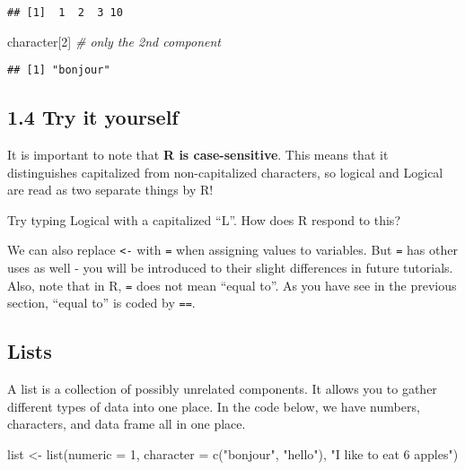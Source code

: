 \documentclass[
]{book}
\newenvironment{Shaded}{\begin{snugshade}}{\end{snugshade}}
\newcommand{\AttributeTok}[1]{\textcolor[rgb]{0.77,0.63,0.00}{#1}}
\newcommand{\CommentTok}[1]{\textcolor[rgb]{0.56,0.35,0.01}{\textit{#1}}}
\newcommand{\DecValTok}[1]{\textcolor[rgb]{0.00,0.00,0.81}{#1}}
\newcommand{\FunctionTok}[1]{\textcolor[rgb]{0.00,0.00,0.00}{#1}}
\newcommand{\NormalTok}[1]{#1}
\newcommand{\OtherTok}[1]{\textcolor[rgb]{0.56,0.35,0.01}{#1}}
\newcommand{\StringTok}[1]{\textcolor[rgb]{0.31,0.60,0.02}{#1}}
\begin{document}
\begin{verbatim}
## [1]  1  2  3 10
\end{verbatim}

\begin{Shaded}
\begin{Highlighting}[]
\NormalTok{character[}\DecValTok{2}\NormalTok{] }\CommentTok{\# only the 2nd component}
\end{Highlighting}
\end{Shaded}

\begin{verbatim}
## [1] "bonjour"
\end{verbatim}

\hypertarget{try-it-yourself-3}{%
\subsection{1.4 Try it yourself}\label{try-it-yourself-3}}

It is important to note that \textbf{R is case-sensitive}. This means that it distinguishes capitalized from non-capitalized characters, so logical and Logical are read as two separate things by R!

Try typing Logical with a capitalized ``L''. How does R respond to this?

We can also replace \texttt{\textless{}-} with \texttt{=} when assigning values to variables. But \texttt{=} has other uses as well - you will be introduced to their slight differences in future tutorials. Also, note that in R, \texttt{=} does not mean ``equal to''. As you have see in the previous section, ``equal to'' is coded by \texttt{==}.

\hypertarget{lists}{%
\subsection{Lists}\label{lists}}

A list is a collection of possibly unrelated components. It allows you to gather different types of data into one place. In the code below, we have numbers, characters, and data frame all in one place.

\begin{Shaded}
\begin{Highlighting}[]
\NormalTok{list }\OtherTok{\textless{}{-}} \FunctionTok{list}\NormalTok{(}\AttributeTok{numeric =} \DecValTok{1}\NormalTok{, }\AttributeTok{character =} \FunctionTok{c}\NormalTok{(}\StringTok{"bonjour"}\NormalTok{, }\StringTok{"hello"}\NormalTok{), }\StringTok{"I like to eat 6 apples"}\NormalTok{)}
\end{Highlighting}
\end{Shaded}
\end{document}
